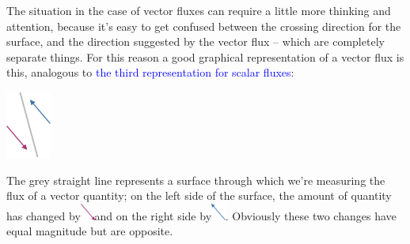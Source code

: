 \documentclass[a4paper,12pt,%
onecolumn,oneside,titlepage,%
british%
]{memoir}
\renewcommand*{\|}[1][]{\nonscript\:#1\vert\nonscript\:\mathopen{}}
\newcommand*{\sect}{\S}%
\renewcommand*{\autoref}[2]{\sidepar{\vspace{-1ex}\footnotesize{\color{blue}\faIcon{%
reply%
}\enspace\sect\,\ref{#1} page\,\pageref{#1}}}\textcolor{blue}{#2}}
\begin{document}
The situation in the case of vector fluxes can require a little more thinking and attention, because it's easy to get confused between the crossing direction for the surface, and the direction suggested by the vector flux -- which are completely separate things. For this reason a good graphical representation of a vector flux is this, analogous to \autoref{fig:scalar_fluxes}{the third representation for scalar fluxes}:
\begin{center}
  \includegraphics[height=6em]{images/flux_vec_minusplus.pdf}
\end{center}
The \textcolor{midgrey}{grey straight line} represents a surface through which we're measuring the flux of a vector quantity; on the left side of the surface, the amount of quantity has changed by\enspace\includegraphics[align=c,height=1.5em]{images/vec_flux_left.pdf}\enspace and on the right side by\enspace\includegraphics[align=c,height=1.5em]{images/vec_flux_right.pdf}\:.
Obviously these two changes have equal magnitude but are opposite.

\medskip
\end{document}
